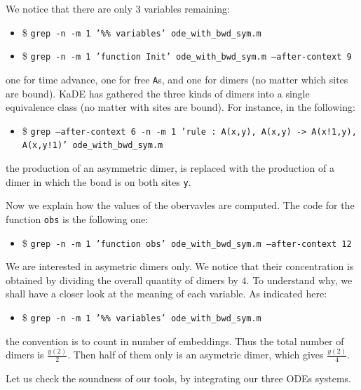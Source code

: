 \documentclass[11pt]{book}
\def\KaDE{\textsf{KaDE}}
\def\ttt#1{\texttt{#1}}
\def\ITE#1{\begin{itemize}#1\end{itemize}}
\begin{document}
We notice that there are only $3$ variables remaining:
\ITE{
\item[\$] \ttt{grep -n -m 1 '\%\% variables' ode\_with\_bwd\_sym.m}}

\ITE{
\item[\$] \ttt{grep -n -m 1 'function Init' ode\_with\_bwd\_sym.m --after-context 9 }}

one for time advance, one for free \texttt{A}{}s, and one for dimers (no matter which sites are bound). {\KaDE} has gathered the three kinds of dimers into a single equivalence class (no matter with sites are bound).  For instance, in the following:
\ITE{
\item[\$] \ttt{grep --after-context 6 -n -m 1 'rule    : A(x,y), A(x,y) -> A(x!1,y), A(x,y!1)' ode\_with\_bwd\_sym.m }}

 the production of an asymmetric dimer, is replaced with the production of a dimer in which the bond is on both sites \texttt{y}.

Now we explain how the values of the obervavles are computed.
The code for the function \texttt{obs} is the following one:
\ITE{
\item[\$] \ttt{grep -n -m 1 'function obs' ode\_with\_bwd\_sym.m --after-context 12}}

 We are interested in asymetric dimers only. We notice that their concentration is obtained by dividing the overall quantity of dimers by $4$. To understand why, we shall have a closer look at the meaning of each variable. As indicated here:
\ITE{
\item[\$] \ttt{grep -n -m 1 '\%\% variables' ode\_with\_bwd\_sym.m}}

the convention is to count in number of embeddings. Thus the total number of dimers is $\frac{y(2)}{2}$. Then half of them only is an asymetric dimer, which gives $\frac{y(2)}{4}$.

Let us check the soundness of our tools, by integrating our three  ODEs systems.
\end{document}
